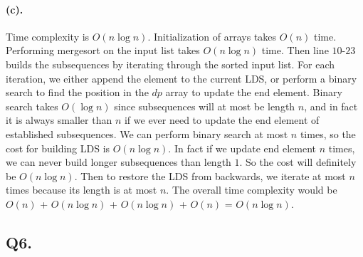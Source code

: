 \documentclass[12pt]{article}
\begin{document}
\paragraph{(c).} Time complexity is \(O(n\log n)\). Initialization of arrays takes \(O(n)\) time. Performing mergesort on the input list takes \(O(n\log n)\) time. Then line \(10\text{-}23\) builds the subsequences by iterating through the sorted input list. For each iteration, we either append the element to the current LDS, or perform a binary search to find the position in the \(dp\) array to update the end element. Binary search takes \(O(\log n)\) since subsequences will at most be length \(n\), and in fact it is always smaller than \(n\) if we ever need to update the end element of established subsequences. We can perform binary search at most \(n\) times, so the cost for building LDS is \(O(n\log n)\). In fact if we update end element \(n\) times, we can never build longer subsequences than length \(1\). So the cost will definitely be \(O(n\log n)\). Then to restore the LDS from backwards, we iterate at most \(n\) times because its length is at most \(n\). The overall time complexity would be \(O(n)\) + \(O(n\log n)\) + \(O(n\log n)\) + \(O(n)\) = \(O(n\log n)\).

\subsection*{Q6.}
\end{document}
